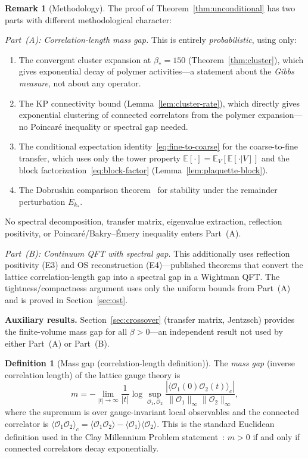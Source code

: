 \documentclass[11pt]{article}
\theoremstyle{definition}
\newtheorem{definition}[theorem]{Definition}
\newtheorem{remark}[theorem]{Remark}
\begin{document}
\begin{remark}[Methodology]\label{rem:method}
The proof of Theorem~\ref{thm:unconditional} has two parts with
different methodological character:

\emph{Part~(A): Correlation-length mass gap.}
This is entirely \emph{probabilistic}, using only:
\begin{enumerate}[nosep]
\item The convergent cluster expansion at $\beta_*=150$
(Theorem~\ref{thm:cluster}), which gives exponential decay
of polymer activities---a statement about the \emph{Gibbs
measure}, not about any operator.
\item The KP connectivity bound (Lemma~\ref{lem:cluster-rate}),
which directly gives exponential clustering of connected
correlators from the polymer expansion---no Poincar\'e
inequality or spectral gap needed.
\item The conditional expectation identity~\eqref{eq:fine-to-coarse}
for the coarse-to-fine transfer, which uses only the tower
property $\mathbb{E}[\cdot]=\mathbb{E}_V[\mathbb{E}[\cdot|V]]$
and the block factorization~\eqref{eq:block-factor}
(Lemma~\ref{lem:plaquette-block}).
\item The Dobrushin comparison theorem~\cite{Dobrushin} for
stability under the remainder perturbation $E_{k_*}$.
\end{enumerate}
No spectral decomposition, transfer matrix, eigenvalue extraction,
reflection positivity, or Poincar\'e/Bakry--\'Emery inequality
enters Part~(A).

\emph{Part~(B): Continuum QFT with spectral gap.}
This additionally uses reflection positivity (E3) and
OS reconstruction (E4)---published theorems that convert the
lattice correlation-length gap into a spectral gap in a
Wightman QFT.  The tightness/compactness argument uses
only the uniform bounds from Part~(A) and is proved in
Section~\ref{sec:ost}.

\textbf{Auxiliary results.}
Section~\ref{sec:crossover}
(transfer matrix, Jentzsch) provides the finite-volume
mass gap for all $\beta>0$---an independent result not
used by either Part~(A) or Part~(B).
\end{remark}

\begin{definition}[Mass gap (correlation-length definition)]%
\label{def:massgap}
The \emph{mass gap} (inverse correlation length) of the lattice
gauge theory is
\begin{equation}
m=-\lim_{|t|\to\infty}\frac{1}{|t|}
\log\sup_{\mathcal{O}_1,\mathcal{O}_2}
\frac{|\langle\mathcal{O}_1(0)\mathcal{O}_2(t)\rangle_c|}
{\|\mathcal{O}_1\|_\infty\|\mathcal{O}_2\|_\infty},
\end{equation}
where the supremum is over gauge-invariant local observables
and the connected correlator is
$\langle\mathcal{O}_1\mathcal{O}_2\rangle_c
=\langle\mathcal{O}_1\mathcal{O}_2\rangle
-\langle\mathcal{O}_1\rangle\langle\mathcal{O}_2\rangle$.
This is the standard Euclidean definition used in the
Clay Millennium Problem statement~\cite{JaffeWitten}:
$m>0$ if and only if connected correlators decay
exponentially.
\end{definition}
\end{document}
